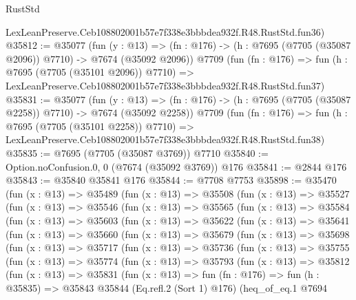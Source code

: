 \begin{lexlean}{RustStd}
\begin{coremodule}
    LexLeanPreserve.Ceb108802001b57e7f338e3bbbdea932f.R48.RustStd.fun36)
@35812 := @35077
    (fun (y : @13) =>
    (fn : @176) -> (h : @7695 (@7705 (@35087 @2096)) @7710) -> @7674 (@35092 @2096))
    @7709
    (fun (fn : @176) =>
    fun (h : @7695 (@7705 (@35101 @2096)) @7710) =>
    LexLeanPreserve.Ceb108802001b57e7f338e3bbbdea932f.R48.RustStd.fun37)
@35831 := @35077
    (fun (y : @13) =>
    (fn : @176) -> (h : @7695 (@7705 (@35087 @2258)) @7710) -> @7674 (@35092 @2258))
    @7709
    (fun (fn : @176) =>
    fun (h : @7695 (@7705 (@35101 @2258)) @7710) =>
    LexLeanPreserve.Ceb108802001b57e7f338e3bbbdea932f.R48.RustStd.fun38)
@35835 := @7695 (@7705 (@35087 @3769)) @7710
@35840 := Option.noConfusion.{0, 0} (@7674 (@35092 @3769)) @176
@35841 := @2844 @176
@35843 := @35840 @35841 @176
@35844 := @7708 @7753
@35898 := @35470
    (fun (x : @13) =>
    @35489
      (fun (x : @13) =>
      @35508
        (fun (x : @13) =>
        @35527
          (fun (x : @13) =>
          @35546
            (fun (x : @13) =>
            @35565
              (fun (x : @13) =>
              @35584
                (fun (x : @13) =>
                @35603
                  (fun (x : @13) =>
                  @35622
                    (fun (x : @13) =>
                    @35641
                      (fun (x : @13) =>
                      @35660
                        (fun (x : @13) =>
                        @35679
                          (fun (x : @13) =>
                          @35698
                            (fun (x : @13) =>
                            @35717
                              (fun (x : @13) =>
                              @35736
                                (fun (x : @13) =>
                                @35755
                                  (fun (x : @13) =>
                                  @35774
                                    (fun (x : @13) =>
                                    @35793
                                      (fun (x : @13) =>
                                      @35812
                                        (fun (x : @13) =>
                                        @35831
                                          (fun (x : @13) =>
                                          fun (fn : @176) =>
                                          fun (h : @35835) =>
                                          @35843
                                            @35844
                                            (Eq.refl.{2} (Sort 1) @176)
                                            (heq_of_eq.{1}
                                              @7694

\end{coremodule}
\end{lexlean}
